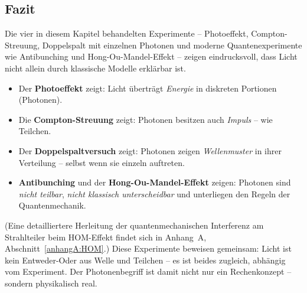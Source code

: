 \subsection{Fazit}

\begin{tcolorbox}[hinweisbox, title=Was die Experimente über Licht zeigen]
	\label{box:was die Experimente}
	\small
	Die vier in diesem Kapitel behandelten Experimente – Photoeffekt, Compton-Streuung, Doppelspalt mit einzelnen Photonen und moderne Quantenexperimente wie Antibunching und Hong-Ou-Mandel-Effekt – zeigen eindrucksvoll, dass Licht nicht allein durch klassische Modelle erklärbar ist.
	
	\begin{itemize}
		\item Der \textbf{Photoeffekt} zeigt: Licht überträgt \emph{Energie} in diskreten Portionen (Photonen).
		\item Die \textbf{Compton-Streuung} zeigt: Photonen besitzen auch \emph{Impuls} – wie Teilchen.
		\item Der \textbf{Doppelspaltversuch} zeigt: Photonen zeigen \emph{Wellenmuster} in ihrer Verteilung – selbst wenn sie einzeln auftreten.
		\item \textbf{Antibunching} und der \textbf{Hong-Ou-Mandel-Effekt} zeigen: Photonen sind \emph{nicht teilbar}, \emph{nicht klassisch unterscheidbar} und unterliegen den Regeln der Quantenmechanik.
	\end{itemize}
	(Eine detailliertere Herleitung der quantenmechanischen Interferenz am Strahlteiler beim HOM-Effekt findet sich in Anhang~A, Abschnitt~\ref{anhangA:HOM}.) %
	Diese Experimente beweisen gemeinsam: Licht ist kein Entweder-Oder aus Welle und Teilchen – es ist beides zugleich, abhängig vom Experiment. Der Photonenbegriff ist damit nicht nur ein Rechenkonzept – sondern physikalisch real.
\end{tcolorbox}
